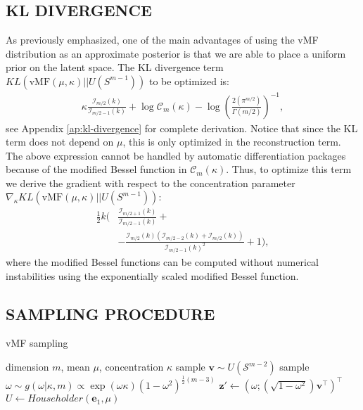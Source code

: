 \documentclass[letterpaper]{article}
\newcommand{\z}{\mathbf{z}}
\newcommand{\e}{\mathbf{e}}
\newcommand{\vv}{\mathbf{v}}
\begin{document}
\subsection{KL DIVERGENCE} \label{subsec:kl}
As previously emphasized, one of the main advantages of using the vMF distribution as an approximate posterior is that we are able to place a uniform prior on the latent space. The KL divergence term $KL(\text{vMF}(\mu, \kappa)|| U(S^{m-1}))$ to be optimized is: 
\begin{align} \label{eq:kl}
\kappa \frac{\mathcal{I}_{m/2}(k)}{\mathcal{I}_{m/2 - 1}(k)} + \log \mathcal{C}_m(\kappa) - \log \left( \frac{2(\pi^{m/2})}{\Gamma(m/2)} \right)^{-1},
\end{align}
see Appendix \ref{ap:kl-divergence} for complete derivation. Notice that since the KL term does not depend on $\mu$, this is only optimized in the reconstruction term. The above expression cannot be handled by automatic differentiation packages because of the modified Bessel function in $\mathcal{C}_m(\kappa)$. Thus, to optimize this term we derive the gradient with respect to the concentration parameter $\nabla_{\kappa}KL(\text{vMF}(\mu, \kappa)|| U(S^{m-1}))$:
\begin{align}\label{eq:kl-grad}
\frac12 k \Biggl(& \frac{\mathcal{I}_{m/2+1}(k)}{\mathcal{I}_{m/2 - 1}(k)} +
\nonumber \\
&- \frac{\mathcal{I}_{m/2}(k) \left( \mathcal{I}_{m/2 - 2}(k) + \mathcal{I}_{m/2}(k) \right) }{\mathcal{I}_{m/2 - 1}(k)^2} + 1 \Biggl),
\end{align}
where the modified Bessel functions can be computed without numerical instabilities using the exponentially scaled modified Bessel function.

\subsection{SAMPLING PROCEDURE}\label{sec:sampling}

\begin{algorithm}[tb]\label{sampling-vmf}
   \caption{vMF sampling}
   \label{alg:vmf-sample}
\begin{algorithmic}
     dimension $m$, mean $\mu$, concentration $\kappa$
    \STATE sample $\vv \sim U(\mathcal{S}^{m-2})$
    \STATE sample $\omega \sim g(\omega| \kappa,m) \propto \exp(\omega \kappa)(1-\omega^2)^{\frac{1}{2}(m-3)}$ 
    \STATE $\z'\gets (\omega; (\sqrt{1-\omega^2}) \vv^\top )^\top$
    \STATE $U\gets Householder(\e_1,\mu)$ 
    \STATE{\bfseries Return:}{ $U\z'$}
\end{algorithmic}
\end{algorithm}
\end{document}
